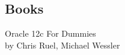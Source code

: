 
\setcounter{secnumdepth}{0}
\subsection{Books}

Oracle 12c For Dummies\\
by Chris Ruel, Michael Wessler\\
\\


